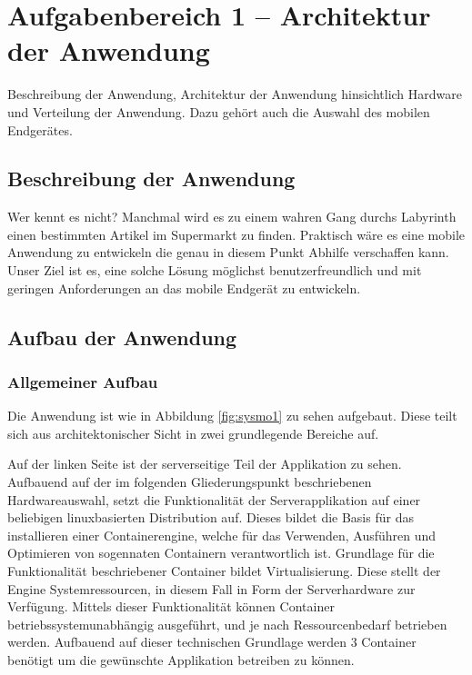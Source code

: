 \section{Aufgabenbereich 1 -- Architektur der Anwendung}
Beschreibung der Anwendung, Architektur der Anwendung hinsichtlich Hardware und Verteilung der Anwendung.
Dazu gehört auch die Auswahl des mobilen Endgerätes.

\subsection{Beschreibung der Anwendung}
Wer kennt es nicht? Manchmal wird es zu einem wahren Gang durchs Labyrinth einen bestimmten Artikel im Supermarkt zu finden.
Praktisch wäre es eine mobile Anwendung zu entwickeln die genau in diesem Punkt Abhilfe verschaffen kann.
Unser Ziel ist es, eine solche Lösung möglichst benutzerfreundlich und mit geringen Anforderungen an das mobile Endgerät zu entwickeln.


\subsection{Aufbau der Anwendung}
\subsubsection{Allgemeiner Aufbau}
Die Anwendung ist wie in Abbildung \ref{fig:sysmo1} zu sehen aufgebaut. Diese teilt sich aus architektonischer Sicht in zwei grundlegende
Bereiche auf.

Auf der linken Seite ist der serverseitige Teil der Applikation zu sehen. Aufbauend auf der im folgenden Gliederungspunkt
beschriebenen Hardwareauswahl, setzt die Funktionalität der Serverapplikation auf einer beliebigen linuxbasierten Distribution auf. Dieses
bildet die Basis für das installieren einer Containerengine, welche für das Verwenden, Ausführen und Optimieren von sogennaten Containern 
verantwortlich ist.  
Grundlage für die Funktionalität beschriebener Container bildet Virtualisierung. Diese stellt der Engine Systemressourcen, in diesem Fall
in Form der Serverhardware zur Verfügung. Mittels dieser Funktionalität können Container betriebssystemunabhängig ausgeführt, und je nach Ressourcenbedarf betrieben werden. Aufbauend auf dieser technischen Grundlage werden 3 Container benötigt um die gewünschte Applikation 
betreiben zu können. 

